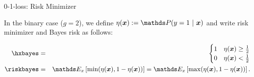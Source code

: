 \begin{vbframe}{0-1-loss: Risk Minimizer}
\lz 

In the binary case ($g = 2$), we define $\eta(\xv) := \P(y = 1 ~|~ \xv)$ and write risk minimizer and Bayes risk as follows:  

\begin{eqnarray*}
  \hxbayes &=& \begin{cases} 1 & \eta(\xv) \ge \frac{1}{2} \\ 0 & \eta(\xv) < \frac{1}{2}\end{cases} \\
  \riskbayes &=& \E_x\left[\min(\eta(\xv), 1 - \eta(\xv))\right] = \E_x\left[\max(\eta(\xv), 1 - \eta(\xv))\right] . 
\end{eqnarray*}

















  


\end{vbframe}
